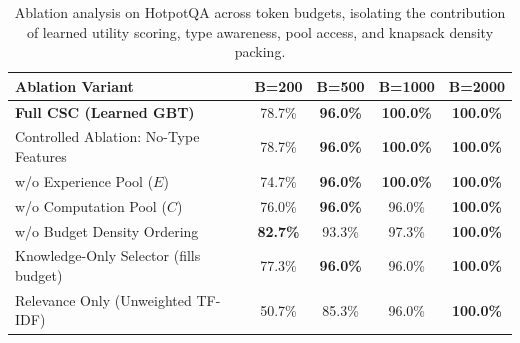 \begin{table}[t]
\centering
\small
\begin{tabular}{lcccc}
\toprule
\textbf{Ablation Variant} & \textbf{B=200} & \textbf{B=500} & \textbf{B=1000} & \textbf{B=2000} \\
\midrule
\textbf{Full CSC (Learned GBT)} & 78.7\% & \textbf{96.0\%} & \textbf{100.0\%} & \textbf{100.0\%} \\
Controlled Ablation: No-Type Features & 78.7\% & \textbf{96.0\%} & \textbf{100.0\%} & \textbf{100.0\%} \\
w/o Experience Pool ($E$) & 74.7\% & \textbf{96.0\%} & \textbf{100.0\%} & \textbf{100.0\%} \\
w/o Computation Pool ($C$) & 76.0\% & \textbf{96.0\%} & 96.0\% & \textbf{100.0\%} \\
w/o Budget Density Ordering & \textbf{82.7\%} & 93.3\% & 97.3\% & \textbf{100.0\%} \\
Knowledge-Only Selector (fills budget) & 77.3\% & \textbf{96.0\%} & 96.0\% & \textbf{100.0\%} \\
Relevance Only (Unweighted TF-IDF) & 50.7\% & 85.3\% & 96.0\% & \textbf{100.0\%} \\
\bottomrule
\end{tabular}
\caption{Ablation analysis on HotpotQA across token budgets, isolating the contribution of learned utility scoring, type awareness, pool access, and knapsack density packing.}
\label{tab:ablation_study}
\end{table}